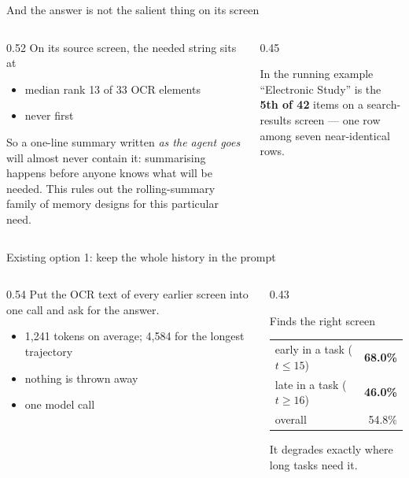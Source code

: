 \documentclass[aspectratio=169,10pt]{beamer}
\newcommand{\gr}[1]{{\color{ncgray}#1}}
\begin{document}
\begin{frame}{And the answer is not the salient thing on its screen}
\vspace{0.4cm}
\begin{columns}[T]
\begin{column}{0.52\textwidth}
On its source screen, the needed string sits at
\begin{itemize}\setlength\itemsep{0.3em}
\item median rank \alert{13 of 33} OCR elements
\item \alert{never} first
\end{itemize}
\vspace{0.8em}
So a one-line summary written \emph{as the agent goes} will almost never contain it: summarising happens before anyone knows what will be needed.
\vspace{0.6em}
\gr{This rules out the rolling-summary family of memory designs for this particular need.}
\end{column}
\begin{column}{0.45\textwidth}
\centering
\begin{block}{In the running example}
``Electronic Study'' is the \textbf{5th of 42} items on a search-results screen ---
one row among seven near-identical rows.
\end{block}
\end{column}
\end{columns}
\end{frame}

\begin{frame}{Existing option 1: keep the whole history in the prompt}
\vspace{0.35cm}
\begin{columns}[T]
\begin{column}{0.54\textwidth}
Put the OCR text of \alert{every} earlier screen into one call and ask for the answer.
\vspace{0.7em}
\begin{itemize}\setlength\itemsep{0.3em}
\item 1,241 tokens on average; 4,584 for the longest trajectory
\item nothing is thrown away
\item one model call
\end{itemize}
\end{column}
\begin{column}{0.43\textwidth}
\begin{block}{Finds the right screen}
\begin{tabular}{lr}
early in a task ($t\le15$) & \textbf{68.0\%}\\
late in a task ($t\ge16$) & {\color{wolfred}\textbf{46.0\%}}\\
overall & 54.8\%\\
\end{tabular}
\end{block}
\vspace{0.3em}
\gr{It degrades exactly where long tasks need it.}
\end{column}
\end{columns}
\end{frame}
\end{document}
